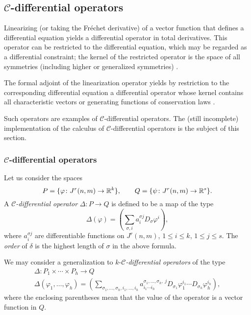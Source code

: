 \subsection[C-differential operators]{$\mathcal{C}$-differential operators}
\label{cdesec:mathc-diff-oper-1}

Linearizing (or taking the Fr\'echet derivative) of a vector function that
defines a differential equation yields a differential operator in total
derivatives. This operator can be restricted to the differential equation,
which may be regarded as a differential constraint; the kernel of the
restricted operator is the space of all symmetries (including higher or
generalized symmetries) \cite{Krasilshchik:99,Olver:93}.

The formal adjoint of the linearization operator yields by restriction to the
corresponding differential equation a differential operator whose kernel
contains all characteristic vectors or generating functions of conservation
laws \cite{Krasilshchik:99,Olver:93}.

Such operators are examples of $\mathcal{C}$-differential operators. The (still
incomplete) \REDUCE implementation of the calculus of
$\mathcal{C}$-differential operators is the subject of this section.

\subsubsection[C-differential operators]{$\mathcal{C}$-differential operators}
\label{cdesec:mathc-diff-oper}

Let us consider the spaces
\begin{displaymath}
  P=\{\varphi\colon J^r(n,m)\to \mathbb{R}^k\},\qquad Q=\{\psi\colon J^r(n,m)\to \mathbb{R}^s\}.
\end{displaymath}
A \emph{$\mathcal{C}$-differential operator} $\Delta\colon P\to Q$ is defined
to be a map of the type
\begin{equation}\label{eq:4}
  \Delta(\varphi) = (\sum_{\sigma, i}a^{\sigma j}_i D_\sigma \varphi^i),
\end{equation}
where $a^{\sigma j}_i$ are differentiable functions on $J^r(n,m)$, $1\leq i\leq
k$, $1\leq j\leq s$. The \emph{order} of $\delta$ is the highest length of
$\sigma$ in the above formula.

We may consider a generalization to $k$-\emph{$\mathcal{C}$-differential
  operators} of the type
\begin{multline}\label{eq:7}
  \Delta\colon P_1\times\cdots\times P_h \to Q\\
  \Delta(\varphi_1,\dots,\varphi_h) =
  (\sum_{\sigma_1,\ldots,\sigma_h, i_1,\ldots,
    i_h}a^{\sigma_1,\ldots,\sigma_h,\ j}_{i_1\cdots i_h} D_{\sigma_1}
  \varphi_1^{i_1}\cdots D_{\sigma_h}\varphi_h^{i_h}),
\end{multline}
where the enclosing parentheses mean that the value of the operator is a vector
function in $Q$.

